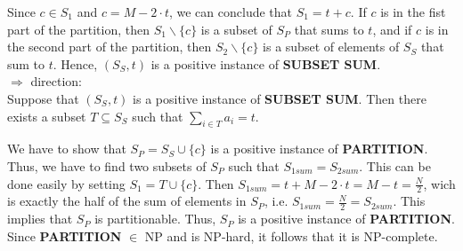 \noindent Since $c\in S_1$ and $c=M-2\cdot t$, we can conclude that $S_1=t+c$. If $c$
is in the fist part of the partition, then $S_1\backslash \{c\}$ is a subset
of $S_P$ that sums to $t$, and if $c$ is in the second part of the partition,
then $S_2\backslash \{c\}$ is a subset of elements of $S_S$ that sum to $t$.
Hence, $(S_S,t)$ is a positive instance of \textbf{SUBSET SUM}.\\

\noindent $\Rightarrow$ direction:\\
Suppose that $(S_S,t)$ is a positive instance of 
\textbf{SUBSET SUM}. Then there exists a subset $T\subseteq S_S$ such that 
$\sum \limits_{i\in T} a_{i}=t$.

\noindent We have to show that $S_P=S_S\cup \{c\}$ is a positive instance of 
\textbf{PARTITION}. Thus, we have to find two subsets of $S_P$
such that $S_{1sum}=S_{2sum}$. This can be done easily by setting $S_1=T\cup \{c\}$.
Then $S_{1sum}=t+M-2\cdot t=M-t=\frac{N}{2}$, wich is exactly the half of the
sum of elements in $S_P$, i.e. $S_{1sum}=\frac{N}{2}=S_{2sum}$. This
implies that $S_P$ is partitionable. Thus, $S_P$ is a
positive instance of \textbf{PARTITION}.\\


\noindent Since \textbf{PARTITION} $\in $ NP and is NP-hard, it follows that it is
NP-complete.